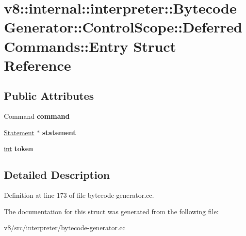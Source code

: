 \hypertarget{structv8_1_1internal_1_1interpreter_1_1BytecodeGenerator_1_1ControlScope_1_1DeferredCommands_1_1Entry}{}\section{v8\+:\+:internal\+:\+:interpreter\+:\+:Bytecode\+Generator\+:\+:Control\+Scope\+:\+:Deferred\+Commands\+:\+:Entry Struct Reference}
\label{structv8_1_1internal_1_1interpreter_1_1BytecodeGenerator_1_1ControlScope_1_1DeferredCommands_1_1Entry}
\subsection*{Public Attributes}
\begin{DoxyCompactItemize}
\item 
\mbox{\label{structv8_1_1internal_1_1interpreter_1_1BytecodeGenerator_1_1ControlScope_1_1DeferredCommands_1_1Entry_a38c78fbe1ff0c4ef6bdd18288a5cb462}} 
Command {\bfseries command}
\item 
\mbox{\label{structv8_1_1internal_1_1interpreter_1_1BytecodeGenerator_1_1ControlScope_1_1DeferredCommands_1_1Entry_af10ad8734b5e1015f556ee34c1856dcc}} 
\mbox{\hyperlink{classv8_1_1internal_1_1Statement}{Statement}} $\ast$ {\bfseries statement}
\item 
\mbox{\label{structv8_1_1internal_1_1interpreter_1_1BytecodeGenerator_1_1ControlScope_1_1DeferredCommands_1_1Entry_a74e9d5204bec09eeca97b53992cd0698}} 
\mbox{\hyperlink{classint}{int}} {\bfseries token}
\end{DoxyCompactItemize}


\subsection{Detailed Description}


Definition at line 173 of file bytecode-\/generator.\+cc.



The documentation for this struct was generated from the following file\+:\begin{DoxyCompactItemize}
\item 
v8/src/interpreter/bytecode-\/generator.\+cc\end{DoxyCompactItemize}
